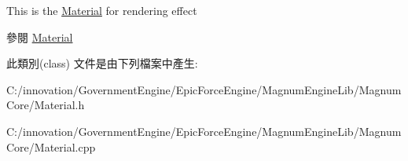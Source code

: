 This is the \hyperlink{class_i_dream_sky_1_1_material}{Material} for rendering effect \begin{DoxySeeAlso}{參閱}
\hyperlink{class_i_dream_sky_1_1_material}{Material} 
\end{DoxySeeAlso}


此類別(class) 文件是由下列檔案中產生\+:\begin{DoxyCompactItemize}
\item 
C\+:/innovation/\+Government\+Engine/\+Epic\+Force\+Engine/\+Magnum\+Engine\+Lib/\+Magnum\+Core/Material.\+h\item 
C\+:/innovation/\+Government\+Engine/\+Epic\+Force\+Engine/\+Magnum\+Engine\+Lib/\+Magnum\+Core/Material.\+cpp\end{DoxyCompactItemize}
